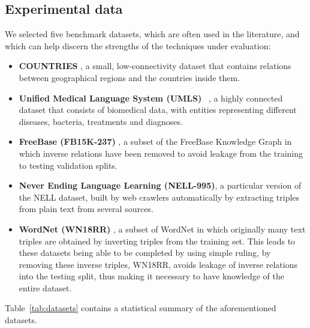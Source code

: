 \subsection{Experimental data}

We selected five benchmark datasets, which are often used in the literature, and which can help discern the strengths of the techniques under evaluation:

\begin{itemize}
    \item \textbf{COUNTRIES} \cite{bouchard2015approximate}, a small, low-connectivity dataset that contains relations between geographical regions and the countries inside them.
    
    \item \textbf{Unified Medical Language System (UMLS)} ~\cite{kok2007statistical}, a highly connected dataset that consists of biomedical data, with entities representing different diseases, bacteria, treatments and diagnoses.
    
    \item \textbf{FreeBase (FB15K-237)} \cite{toutanova2015representing}, a subset of the FreeBase Knowledge Graph in which inverse relations have been removed to avoid leakage from the training to testing validation splits.
    
    \item \textbf{Never Ending Language Learning (NELL-995)}\cite{xiong2017deeppath}, a particular version of the NELL dataset, built by web crawlers automatically by extracting triples from plain text from several sources.
    
    \item \textbf{WordNet (WN18RR)} \cite{miller1995wordnet}, a subset of WordNet in which originally many text triples are obtained by inverting triples from the training set. \cite{dettmers2018convolutional}
    This leads to these datasets being able to be completed by using simple ruling, by removing these inverse triples, WN18RR, avoids leakage of inverse relations into the testing split, thus making it necessary to have knowledge of the entire dataset.
\end{itemize}

Table~\ref{tab:datasets} contains a statistical summary of the aforementioned datasets.




